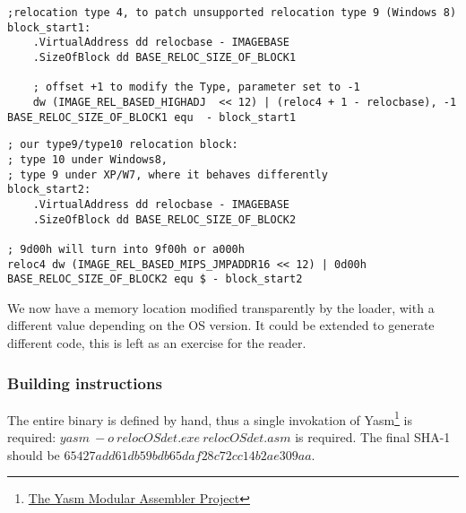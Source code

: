 \documentclass{article}
\begin{document}
\begin{lstlisting}
;relocation type 4, to patch unsupported relocation type 9 (Windows 8)
block_start1:
    .VirtualAddress dd relocbase - IMAGEBASE
    .SizeOfBlock dd BASE_RELOC_SIZE_OF_BLOCK1

    ; offset +1 to modify the Type, parameter set to -1
    dw (IMAGE_REL_BASED_HIGHADJ  << 12) | (reloc4 + 1 - relocbase), -1 
BASE_RELOC_SIZE_OF_BLOCK1 equ  - block_start1
\end{lstlisting}

\begin{lstlisting}
; our type9/type10 relocation block: 
; type 10 under Windows8, 
; type 9 under XP/W7, where it behaves differently
block_start2:
    .VirtualAddress dd relocbase - IMAGEBASE
    .SizeOfBlock dd BASE_RELOC_SIZE_OF_BLOCK2

; 9d00h will turn into 9f00h or a000h
reloc4 dw (IMAGE_REL_BASED_MIPS_JMPADDR16 << 12) | 0d00h
BASE_RELOC_SIZE_OF_BLOCK2 equ $ - block_start2
\end{lstlisting}

We now have a memory location modified transparently by the loader, with a different value depending on the OS version. It could be extended to generate different code, this is left as an exercise for the reader.

\subsubsection{Building instructions}
The entire binary is defined by hand, thus a single invokation of Yasm\footnote{\href{http://yasm.tortall.net/}{The Yasm Modular Assembler Project}} is required:
$ yasm\ -o\  relocOSdet.exe\ relocOSdet.asm$ 
is required. The final SHA-1 should be $65427add61db59bdb65daf28c72cc14b2ae309aa$.
\end{document}
